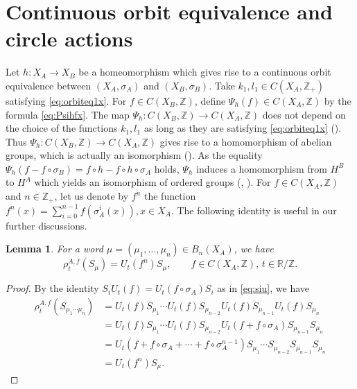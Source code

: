 \documentclass[11pt]{article}
\newtheorem{lemma}[theorem]{Lemma}
\theoremstyle{plain}
\theoremstyle{definition}
\numberwithin{equation}{section}
\newcommand{\RZ}{\mathbb{R}/{\mathbb{Z}}}
\newcommand{\Z}{\mathbb{Z}}
\newcommand{\Zp}{{\mathbb{Z}}_+}
\begin{document}
\section{Continuous orbit equivalence and circle actions}
Let
$h : X_A \rightarrow X_B$
be a homeomorphism
which gives rise to a continuous orbit equivalence
between
$(X_A, \sigma_A)$
and
$(X_B,\sigma_B)$.
Take $k_1, l_1 \in C(X_A,\Zp)$
satisfying \eqref{eq:orbiteq1x}.
For $f \in C(X_B,\Z )$, define
$\Psi_{h}(f) \in C(X_A,\Z)$ 
by the formula
\eqref{eq:Psihfx}.
The map
$\Psi_h: C(X_B,\Z) \rightarrow C(X_A,\Z)$
does not depend on the choice of the functions 
$k_1, l_1$ 
as long as they are satisfying \eqref{eq:orbiteq1x}
(\cite[Lemma 4.2]{MMPre2014}).
Thus $\Psi_h: C(X_B,\Z) \rightarrow C(X_A,\Z)$
gives rise to a homomorphism of abelian groups,
which is actually an isomorphism (\cite[Proposition 4.5]{MMPre2014}).
As the equality
$\Psi_h(f - f \circ\sigma_B) = f \circ h - f \circ h \circ \sigma_A$
holds,
$\Psi_h$ induces a homomorphism
from $H^B$ to $H^A$
which yields an isomorphism of ordered groups
(\cite{MMKyoto}, \cite{MMPre2014}).
For $f \in C(X_A,\Z)$ 
and $n \in \Zp$, let us denote by $f^n$ 
the function 
$f^n(x) =\sum_{i=0}^{n-1}f (\sigma_A^i(x)), x \in X_A$.
The following identity 
is useful in our further discussions.
\begin{lemma}
For a word
$\mu = (\mu_1,\dots,\mu_n) \in B_n(X_A)$,
we have
\begin{equation}
\rho_t^{A,f}(S_\mu) = U_t(f^n)S_\mu,
\qquad f \in C(X_A,\Z),\, t \in \RZ.
\end{equation}
\end{lemma}
\begin{proof}
By the identity 
$S_i U_t(f)
=U_t(f\circ \sigma_A) S_i
$
as in 
\eqref{eq:siu},
we have 
\begin{align*}
\rho_t^{A,f}(S_{\mu_1 \cdots \mu_n}) 
& = U_t(f)S_{\mu_1}\cdots  U_t(f)S_{\mu_{n-2}}
      U_t(f)S_{\mu_{n-1}} U_t(f)S_{\mu_n} \\
& = U_t(f)S_{\mu_1} \cdots U_t(f)S_{\mu_{n-2}} 
      U_t(f + f\circ \sigma_A)S_{\mu_{n-1}} S_{\mu_n} \\
& = U_t(f + f\circ \sigma_A + \cdots +f\circ \sigma_A^{n-1})
S_{\mu_1}\cdots S_{\mu_{n-2}} S_{\mu_{n-1}} S_{\mu_n} \\
& = U_t(f^n)S_\mu.
\end{align*}
\end{proof}
\end{document}
